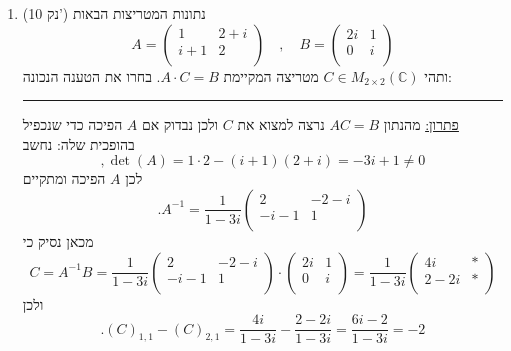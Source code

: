 \documentclass[12pt, a4paper]{article}
\newcommand{\cc}{\mathbb{C}}
\newcommand{\points}[1]{(#1 נק') }
\begin{document}
\begin{enumerate}
\newpage





\item\points{10}
נתונות המטריצות הבאות
$$A=\begin{pmatrix}
1&2+i\\i+1&2\\
\end{pmatrix}\quad,\quad
B=\begin{pmatrix}
2i&1\\0&i\\
\end{pmatrix}$$
ותהי
$C\in M_{2\times 2}(\cc)$
מטריצה  המקיימת
$A\cdot C=B$.
בחרו את הטענה הנכונה:
\begin{enumerate}
\end{enumerate}

\noindent\rule{16cm}{0.4pt}

\underline{פתרון:}
מהנתון
$AC=B$
נרצה למצוא את 
$C$
ולכן נבדוק אם
$A$
הפיכה כדי שנכפיל בהופכית שלה:
נחשב
$$,\det(A)=1\cdot 2 -(i+1)(2+i)=-3i+1\neq 0$$
לכן
$A$
הפיכה ומתקיים
$$.A^{-1}=\frac{1}{1-3i}
\begin{pmatrix}
2&-2-i\\
-i-1&1\\
\end{pmatrix}$$
מכאן נסיק כי
$$C=A^{-1}B=
\frac{1}{1-3i}
\begin{pmatrix}
2&-2-i\\
-i-1&1\\
\end{pmatrix}\cdot
\begin{pmatrix}
2i&1\\0&i\\
\end{pmatrix}
=\frac{1}{1-3i}
\begin{pmatrix}
4i&*\\
2-2i&*\\
\end{pmatrix}$$
ולכן
$$.(C)_{1,1}-(C)_{2,1}
=
\frac{4i}{1-3i}-
\frac{2-2i}{1-3i}=
\frac{6i-2}{1-3i}=-2$$
\newpage


\end{enumerate}
\end{document}
